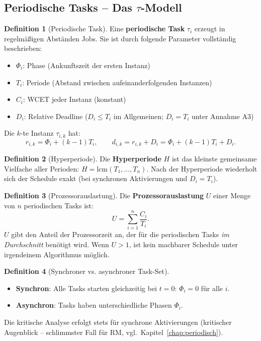 ﻿\documentclass[a4paper,12pt]{report}
\theoremstyle{definition}
\newtheorem{definition}{Definition}[chapter]
\begin{document}
\subsection{Periodische Tasks -- Das $\tau$-Modell}

\begin{definition}[Periodische Task]
	Eine \textbf{periodische Task} $\tau_i$ erzeugt in regelmäßigen Abständen
	Jobs. Sie ist durch folgende Parameter vollständig beschrieben:
	\begin{itemize}
		\item $\Phi_i$: Phase (Ankunftszeit der ersten Instanz)
		\item $T_i$: Periode (Abstand zwischen aufeinanderfolgenden Instanzen)
		\item $C_i$: WCET jeder Instanz (konstant)
		\item $D_i$: Relative Deadline ($D_i \leq T_i$ im Allgemeinen;
		      $D_i = T_i$ unter Annahme A3)
	\end{itemize}
	Die $k$-te Instanz $\tau_{i,k}$ hat:
	\[
		r_{i,k} = \Phi_i + (k-1)T_i, \qquad
		d_{i,k} = r_{i,k} + D_i = \Phi_i + (k-1)T_i + D_i.
	\]
\end{definition}

\begin{definition}[Hyperperiode]
	Die \textbf{Hyperperiode} $H$ ist das kleinste gemeinsame Vielfache aller
	Perioden: $H = \mathrm{lcm}(T_1, \ldots, T_n)$.
	Nach der Hyperperiode wiederholt sich der Schedule exakt (bei synchronen
	Aktivierungen und $D_i = T_i$).
\end{definition}

\begin{definition}[Prozessorauslastung]
	\label{def:util}
	Die \textbf{Prozessorauslastung} $U$ einer Menge von $n$ periodischen Tasks ist:
	\[
		U = \sum_{i=1}^{n} \frac{C_i}{T_i}.
	\]
	$U$ gibt den Anteil der Prozessorzeit an, der für die periodischen Tasks
	\emph{im Durchschnitt} benötigt wird. Wenn $U > 1$, ist kein machbarer
	Schedule unter irgendeinem Algorithmus möglich.
\end{definition}

\begin{definition}[Synchroner vs. asynchroner Task-Set]
	\begin{itemize}
		\item \textbf{Synchron}: Alle Tasks starten gleichzeitig bei $t=0$:
		      $\Phi_i = 0$ für alle $i$.
		\item \textbf{Asynchron}: Tasks haben unterschiedliche Phasen $\Phi_i$.
	\end{itemize}
	Die kritische Analyse erfolgt stets für synchrone Aktivierungen (kritischer
	Augenblick -- schlimmster Fall für RM, vgl.\ Kapitel~\ref{chap:periodisch}).
\end{definition}
\end{document}
